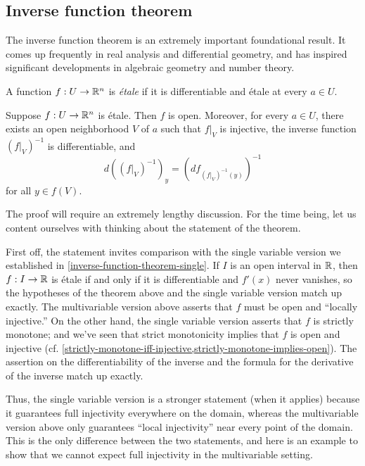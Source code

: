 \subsection{Inverse function theorem}

The inverse function theorem is an extremely important foundational result. It comes up frequently in real analysis and differential geometry, and has inspired significant developments in algebraic geometry and number theory. 

\begin{definition}
	A function $f : U \to \mathbb{R}^n$ is \emph{\'etale} if it is differentiable and \'etale at every $a \in U$. 
\end{definition}

\begin{theorem} \label{inverse-function-theorem}
	Suppose $f : U \to \mathbb{R}^n$ is \'etale. Then $f$ is open. Moreover, for every $a \in U$, there exists an open neighborhood $V$ of $a$ such that $f|_V$ is injective, the inverse function $(f|_V)^{-1}$ is differentiable, and
	\[ d((f|_V)^{-1})_y = (df_{(f|_V)^{-1}(y)})^{-1} \]
	for all $y  \in f(V)$. 
\end{theorem}

The proof will require an extremely lengthy discussion. For the time being, let us content ourselves with thinking about the statement of the theorem. 

First off, the statement invites comparison with the single variable version we established in  \cref{inverse-function-theorem-single}. If $I$ is an open interval in $\mathbb{R}$, then $f : I \to \mathbb{R}$ is \'etale if and only if it is differentiable and $f'(x)$ never vanishes, so the hypotheses of the theorem above and the single variable version match up exactly. The multivariable version above asserts that $f$ must be open and ``locally injective.'' On the other hand, the single variable version asserts that $f$ is strictly monotone; and we've seen that strict monotonicity implies that $f$ is open and injective (cf. \cref{strictly-monotone-iff-injective,strictly-monotone-implies-open}). The assertion on the differentiability of the inverse and the formula for the derivative of the inverse match up exactly.  

Thus, the single variable version is a stronger statement (when it applies) because it guarantees full injectivity everywhere on the domain, whereas the multivariable version above only guarantees ``local injectivity'' near every point of the domain. This is the only difference between the two statements, and here is an example to show that we cannot expect full injectivity in the multivariable setting.  


